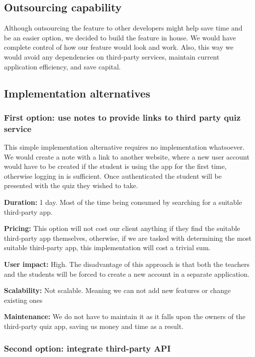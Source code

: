 \documentclass[
    english, %
]{VUMIFPSkursinis}
\begin{document}
\subsection{Outsourcing capability}

Although outsourcing the feature to other developers might help save time and be an easier option, we decided to build the feature in house. We would have complete control of how our feature would look and work. Also, this way we would avoid any dependencies on third-party services, maintain current application efficiency, and save capital.

\subsection{Implementation alternatives}

\subsubsection{First option: use notes to provide links to third party quiz service}

This simple implementation alternative requires no implementation whatsoever.  We would create a note with a link to another website, where a new user account would have to be created if the student is using the app for the first time, otherwise logging in is sufficient. Once authenticated the student will be presented with the quiz they wished to take.

\textbf{Duration:} 1 day. Most of the time being consumed by searching for a suitable third-party app.

\textbf{Pricing:} This option will not cost our client anything if they find the suitable third-party app themselves, otherwise, if we are tasked with determining the most suitable third-party app, this implementation will cost a trivial sum. 

\textbf{User impact:} High. The disadvantage of this approach is that both the teachers and the students will be forced to create a new account in a separate application. 

\textbf{Scalability:} Not scalable. Meaning we can not add new features or change existing ones

\textbf{Maintenance:} We do not have to maintain it as it falls upon the owners of the third-party quiz app, saving us money and time as a result. 

\subsubsection{Second option: integrate third-party API}
\end{document}
